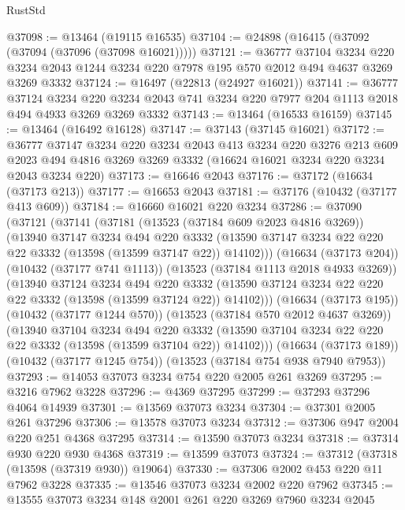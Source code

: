 \begin{lexlean}{RustStd}
\begin{coremodule}
@37098 := @13464 (@19115 @16535)
@37104 := @24898 (@16415 (@37092 (@37094 (@37096 (@37098 @16021)))))
@37121 := @36777
    @37104
    @3234
    @220
    @3234
    @2043
    @1244
    @3234
    @220
    @7978
    @195
    @570
    @2012
    @494
    @4637
    @3269
    @3269
    @3332
@37124 := @16497 (@22813 (@24927 @16021))
@37141 := @36777
    @37124
    @3234
    @220
    @3234
    @2043
    @741
    @3234
    @220
    @7977
    @204
    @1113
    @2018
    @494
    @4933
    @3269
    @3269
    @3332
@37143 := @13464 (@16533 @16159)
@37145 := @13464 (@16492 @16128)
@37147 := @37143 (@37145 @16021)
@37172 := @36777
    @37147
    @3234
    @220
    @3234
    @2043
    @413
    @3234
    @220
    @3276
    @213
    @609
    @2023
    @494
    @4816
    @3269
    @3269
    @3332
    (@16624 @16021 @3234 @220 @3234 @2043 @3234 @220)
@37173 := @16646 @2043
@37176 := @37172 (@16634 (@37173 @213))
@37177 := @16653 @2043
@37181 := @37176 (@10432 (@37177 @413 @609))
@37184 := @16660 @16021 @220 @3234
@37286 := @37090
    (@37121
      (@37141
        (@37181
          (@13523 (@37184 @609 @2023 @4816 @3269))
          (@13940
            @37147
            @3234
            @494
            @220
            @3332
            (@13590 @37147 @3234 @22 @220 @22 @3332 (@13598 (@13599 @37147 @22)) @14102)))
        (@16634 (@37173 @204))
        (@10432 (@37177 @741 @1113))
        (@13523 (@37184 @1113 @2018 @4933 @3269))
        (@13940
          @37124
          @3234
          @494
          @220
          @3332
          (@13590 @37124 @3234 @22 @220 @22 @3332 (@13598 (@13599 @37124 @22)) @14102)))
      (@16634 (@37173 @195))
      (@10432 (@37177 @1244 @570))
      (@13523 (@37184 @570 @2012 @4637 @3269))
      (@13940
        @37104
        @3234
        @494
        @220
        @3332
        (@13590 @37104 @3234 @22 @220 @22 @3332 (@13598 (@13599 @37104 @22)) @14102)))
    (@16634 (@37173 @189))
    (@10432 (@37177 @1245 @754))
    (@13523 (@37184 @754 @938 @7940 @7953))
@37293 := @14053 @37073 @3234 @754 @220 @2005 @261 @3269
@37295 := @3216 @7962 @3228
@37296 := @4369 @37295
@37299 := @37293 @37296 @4064 @14939
@37301 := @13569 @37073 @3234
@37304 := @37301 @2005 @261 @37296
@37306 := @13578 @37073 @3234
@37312 := @37306 @947 @2004 @220 @251 @4368 @37295
@37314 := @13590 @37073 @3234
@37318 := @37314 @930 @220 @930 @4368
@37319 := @13599 @37073
@37324 := @37312 (@37318 (@13598 (@37319 @930)) @19064)
@37330 := @37306 @2002 @453 @220 @11 @7962 @3228
@37335 := @13546 @37073 @3234 @2002 @220 @7962
@37345 := @13555 @37073 @3234 @148 @2001 @261 @220 @3269 @7960 @3234 @2045

\end{coremodule}
\end{lexlean}
